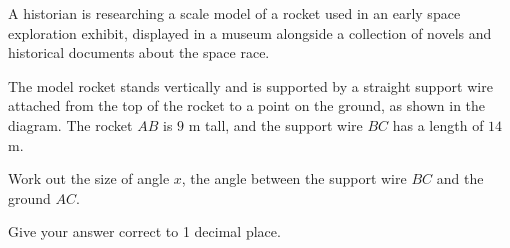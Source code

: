 \begin{question}
\noindent A historian is researching a scale model of a rocket used in an early space exploration exhibit, displayed in a museum alongside a collection of novels and historical documents about the space race.

\noindent The model rocket stands vertically and is supported by a straight support wire attached from the top of the rocket to a point on the ground, as shown in the diagram. The rocket $AB$ is $9$ m tall, and the support wire $BC$ has a length of $14$ m.

\begin{center}
\end{center}

\noindent Work out the size of angle $x$, the angle between the support wire $BC$ and the ground $AC$.

\noindent Give your answer correct to 1 decimal place.
\vspace{4.5cm}
\begin{flushright}
\end{flushright}
\end{question}
